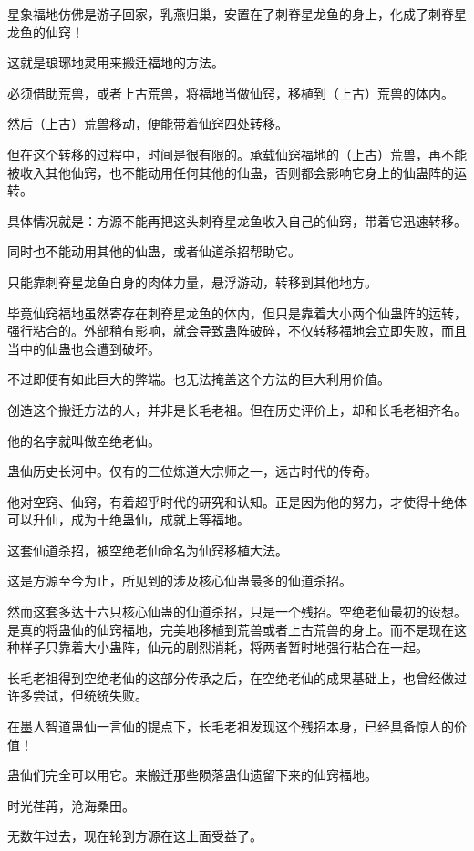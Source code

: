 \begin{this_body}
星象福地仿佛是游子回家，乳燕归巢，安置在了刺脊星龙鱼的身上，化成了刺脊星龙鱼的仙窍！

这就是琅琊地灵用来搬迁福地的方法。

必须借助荒兽，或者上古荒兽，将福地当做仙窍，移植到（上古）荒兽的体内。

然后（上古）荒兽移动，便能带着仙窍四处转移。

但在这个转移的过程中，时间是很有限的。承载仙窍福地的（上古）荒兽，再不能被收入其他仙窍，也不能动用任何其他的仙蛊，否则都会影响它身上的仙蛊阵的运转。

具体情况就是：方源不能再把这头刺脊星龙鱼收入自己的仙窍，带着它迅速转移。

同时也不能动用其他的仙蛊，或者仙道杀招帮助它。

只能靠刺脊星龙鱼自身的肉体力量，悬浮游动，转移到其他地方。

毕竟仙窍福地虽然寄存在刺脊星龙鱼的体内，但只是靠着大小两个仙蛊阵的运转，强行粘合的。外部稍有影响，就会导致蛊阵破碎，不仅转移福地会立即失败，而且当中的仙蛊也会遭到破坏。

不过即便有如此巨大的弊端。也无法掩盖这个方法的巨大利用价值。

创造这个搬迁方法的人，并非是长毛老祖。但在历史评价上，却和长毛老祖齐名。

他的名字就叫做空绝老仙。

蛊仙历史长河中。仅有的三位炼道大宗师之一，远古时代的传奇。

他对空窍、仙窍，有着超乎时代的研究和认知。正是因为他的努力，才使得十绝体可以升仙，成为十绝蛊仙，成就上等福地。

这套仙道杀招，被空绝老仙命名为仙窍移植大法。

这是方源至今为止，所见到的涉及核心仙蛊最多的仙道杀招。

然而这套多达十六只核心仙蛊的仙道杀招，只是一个残招。空绝老仙最初的设想。是真的将蛊仙的仙窍福地，完美地移植到荒兽或者上古荒兽的身上。而不是现在这种样子只靠着大小蛊阵，仙元的剧烈消耗，将两者暂时地强行粘合在一起。

长毛老祖得到空绝老仙的这部分传承之后，在空绝老仙的成果基础上，也曾经做过许多尝试，但统统失败。

在墨人智道蛊仙一言仙的提点下，长毛老祖发现这个残招本身，已经具备惊人的价值！

蛊仙们完全可以用它。来搬迁那些陨落蛊仙遗留下来的仙窍福地。

时光荏苒，沧海桑田。

无数年过去，现在轮到方源在这上面受益了。


\end{this_body}

